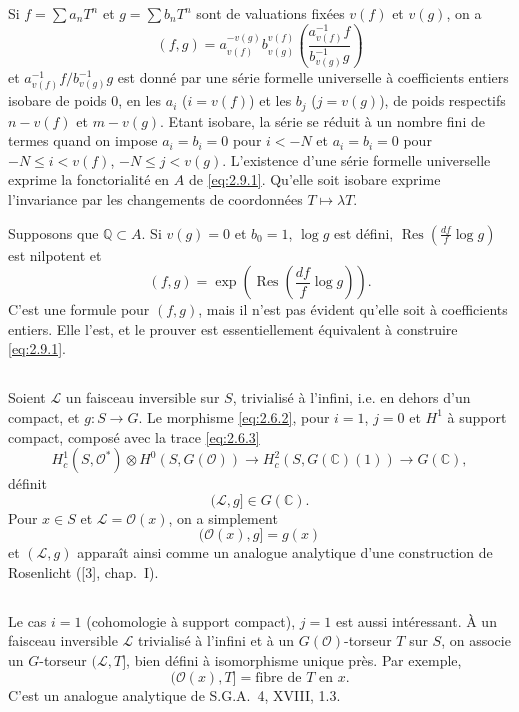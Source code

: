 \documentclass[12pt,a4paper]{article}
\theoremstyle{plain}
\theoremstyle{definition}
\theoremstyle{remark}
\DeclareMathOperator{\Res}{Res}
\newcommand{\cO}{\mathcal{O}}
\newcommand{\Q}{\mathbb{Q}}
\newcommand{\C}{\mathbb{C}}
\newcommand{\cL}{\mathcal{L}}
\providecommand{\cL}{\mathcal{L}}
\providecommand{\cO}{\mathcal{O}}
\begin{document}
Si $f = \sum a_n T^n$ et $g = \sum b_n T^n$ sont de valuations fixées $v(f)$ et $v(g)$, on a
\[
(f,g) = a_{v(f)}^{-v(g)} b_{v(g)}^{v(f)} \left(\frac{a_{v(f)}^{-1} f}{b_{v(g)}^{-1} g}\right)
\]
et $a_{v(f)}^{-1} f / b_{v(g)}^{-1} g$ est donné par une série formelle universelle à coefficients entiers isobare
de poids $0$, en les $a_i$ ($i = v(f)$) et les $b_j$ ($j = v(g)$), de poids respectifs $n - v(f)$
et $m - v(g)$. Etant isobare, la série se réduit à un nombre fini de termes quand on impose
$a_i = b_i = 0$ pour $i < -N$ et $a_i = b_i = 0$ pour $-N \leq i < v(f)$, $-N \leq j < v(g)$.
L'existence d'une série formelle universelle exprime la fonctorialité en $A$ de \eqref{eq:2.9.1}.
Qu'elle soit isobare exprime l'invariance par les changements de coordonnées $T \mapsto \lambda T$.

Supposons que $\Q \subset A$. Si $v(g) = 0$ et $b_0 = 1$, $\log g$ est défini, $\Res(\frac{df}{f}\log g)$ est nilpotent
et
\[
(f,g) = \exp\left(\Res\left(\frac{df}{f}\log g\right)\right).
\]
C'est une formule pour $(f,g)$, mais il n'est pas évident qu'elle soit à coefficients entiers.
Elle l'est, et le prouver est essentiellement équivalent à construire \eqref{eq:2.9.1}.

\subsection{}

Soient $\cL$ un faisceau inversible sur $S$, trivialisé à l'infini, i.e. en dehors
d'un compact, et $g : S \to G$. Le morphisme \eqref{eq:2.6.2}, pour $i = 1$, $j = 0$ et $H^1$ à support
compact, composé avec la trace \eqref{eq:2.6.3}
\[
H^1_c(S, \cO^*) \otimes H^0(S, G(\cO)) \to H^2_c(S, G(\C)(1)) \to G(\C),
\]
définit
\[
(\cL, g] \in G(\C).
\]
Pour $x \in S$ et $\cL = \cO(x)$, on a simplement
\[
(\cO(x), g] = g(x)
\]
et $(\cL, g)$ apparaît ainsi comme un analogue analytique d'une construction de Rosenlicht ([3], chap.~I).

\subsection{}

Le cas $i = 1$ (cohomologie à support compact), $j = 1$ est aussi intéressant.
À un faisceau inversible $\cL$ trivialisé à l'infini et à un $G(\cO)$-torseur $T$ sur $S$, on associe
un $G$-torseur $(\cL, T]$, bien défini à isomorphisme unique près. Par exemple,
\[
(\cO(x), T] = \text{fibre de } T \text{ en } x.
\]
C'est un analogue analytique de S.G.A.~4, XVIII, 1.3.
\end{document}
